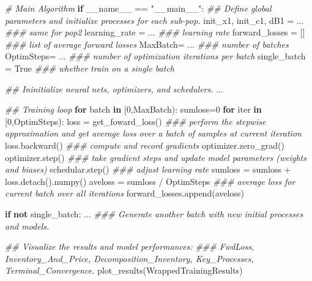 \documentclass[
]{article}
\newenvironment{Shaded}{}{}
\newcommand{\BuiltInTok}[1]{\textcolor[rgb]{0.00,0.50,0.00}{#1}}
\newcommand{\CommentTok}[1]{\textcolor[rgb]{0.38,0.63,0.69}{\textit{#1}}}
\newcommand{\ControlFlowTok}[1]{\textcolor[rgb]{0.00,0.44,0.13}{\textbf{#1}}}
\newcommand{\DecValTok}[1]{\textcolor[rgb]{0.25,0.63,0.44}{#1}}
\newcommand{\KeywordTok}[1]{\textcolor[rgb]{0.00,0.44,0.13}{\textbf{#1}}}
\newcommand{\NormalTok}[1]{#1}
\newcommand{\OperatorTok}[1]{\textcolor[rgb]{0.40,0.40,0.40}{#1}}
\newcommand{\StringTok}[1]{\textcolor[rgb]{0.25,0.44,0.63}{#1}}
\newcommand{\VariableTok}[1]{\textcolor[rgb]{0.10,0.09,0.49}{#1}}
\begin{document}
\begin{Shaded}
\begin{Highlighting}[]
\CommentTok{\# Main Algorithm}
\ControlFlowTok{if} \VariableTok{\_\_name\_\_} \OperatorTok{==} \StringTok{"\_\_main\_\_"}\NormalTok{:}
    \CommentTok{\#\# Define global parameters and initialize processes for each sub{-}pop. }
\NormalTok{    init\_x1, init\_c1, dB1 }\OperatorTok{=}\NormalTok{ ...  }\CommentTok{\#\#\# same for pop2}
\NormalTok{    learning\_rate }\OperatorTok{=}\NormalTok{ ...  }\CommentTok{\#\#\# learning rate}
\NormalTok{    forward\_losses }\OperatorTok{=}\NormalTok{ []  }\CommentTok{\#\#\# list of average forward losses}
\NormalTok{    MaxBatch}\OperatorTok{=}\NormalTok{ ...  }\CommentTok{\#\#\# number of batches}
\NormalTok{    OptimSteps}\OperatorTok{=}\NormalTok{ ...  }\CommentTok{\#\#\# number of optimization iterations per batch}
\NormalTok{    single\_batch }\OperatorTok{=} \VariableTok{True}  \CommentTok{\#\#\# whether train on a single batch }

    \CommentTok{\#\# Ininitialize neural nets, optimizers, and schedulers.}
\NormalTok{    ...}

    \CommentTok{\#\# Training loop}
    \ControlFlowTok{for}\NormalTok{ batch }\KeywordTok{in}\NormalTok{ [}\DecValTok{0}\NormalTok{,MaxBatch):}
\NormalTok{        sumloss}\OperatorTok{=}\DecValTok{0}
        \ControlFlowTok{for} \BuiltInTok{iter} \KeywordTok{in}\NormalTok{ [}\DecValTok{0}\NormalTok{,OptimSteps):}
\NormalTok{             loss }\OperatorTok{=}\NormalTok{ get\_foward\_loss()  }\CommentTok{\#\#\# perform the stepwise approximation and get average loss over a batch of samples at current iteration}
\NormalTok{             loss.backward()  }\CommentTok{\#\#\# compute and record gradients}
\NormalTok{             optimizer.zero\_grad()  }
\NormalTok{             optimizer.step()  }\CommentTok{\#\#\# take gradient steps and update model parameters (weights and biases)}
\NormalTok{             schedular.step()  }\CommentTok{\#\#\# adjust learning rate}
\NormalTok{             sumloss }\OperatorTok{=}\NormalTok{ sumloss }\OperatorTok{+}\NormalTok{ loss.detach().numpy() }
\NormalTok{        aveloss }\OperatorTok{=}\NormalTok{ sumloss }\OperatorTok{/}\NormalTok{ OptimSteps  }\CommentTok{\#\#\# average loss for current batch over all iterations}
\NormalTok{        forward\_losses.append(aveloss)}
    
        \ControlFlowTok{if} \KeywordTok{not}\NormalTok{ single\_batch:}
\NormalTok{            ... }\CommentTok{\#\#\# Generate another batch with new initial processes and models. }
    
    \CommentTok{\#\# Visualize the results and model performances:}
    \CommentTok{\#\#\# FwdLoss, Inventory\_And\_Price, Decomposition\_Inventory, Key\_Processes, Terminal\_Convergence.}
\NormalTok{    plot\_results(WrappedTrainingResults)}
\end{Highlighting}
\end{Shaded}
\end{document}
